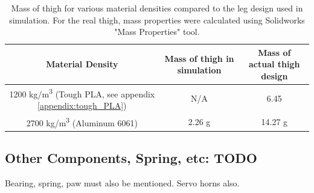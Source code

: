 \begin{table}[h!]
    \centering
    \begin{tabular}{|c|c|c|}
        \hline
        Material Density & Mass of thigh in simulation & Mass of actual thigh design \\ \hline
        1200 kg/m\textsuperscript{3} (Tough PLA, see appendix \ref{appendix:tough_PLA}) & N/A & 6.45 \\
        2700 kg/m\textsuperscript{3} (Aluminum 6061) & 2.26 g & 14.27 g \\
        \hline
    \end{tabular}
    \caption{Mass of thigh for various material densities compared to the leg design used in simulation. For the real thigh, mass properties were calculated using Solidworks "Mass Properties" tool. }
    \label{tab:thigh_mass_comparison}
\end{table}

\subsection{Other Components, Spring, etc: TODO}

Bearing, spring, paw must also be mentioned. Servo horns also. 
